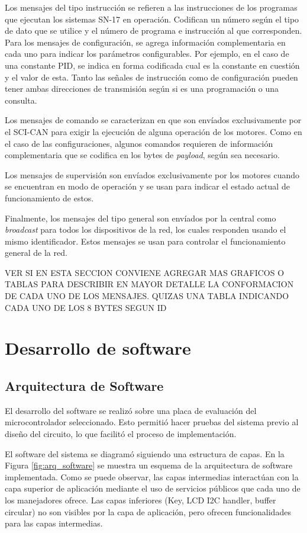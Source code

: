 Los mensajes del tipo instrucción se refieren a las instrucciones de los programas que ejecutan los sistemas SN-17 en operación. Codifican un número según el tipo de dato que se utilice y el número de programa e instrucción al que corresponden. Para los mensajes de configuración, se agrega información complementaria en cada uno para indicar los parámetros configurables. Por ejemplo, en el caso de una constante PID, se indica en forma codificada cual es la constante en cuestión y el valor de esta. Tanto las señales de instrucción como de configuración pueden tener ambas direcciones de transmisión según si es una programación o una consulta.

Los mensajes de comando se caracterizan en que son envíados exclusivamente por el SCI-CAN para exigir la ejecución de alguna operación de los motores. Como en el caso de las configuraciones, algunos comandos requieren de información complementaria que se codifica en los bytes de \textit{payload}, según sea necesario.

Los mensajes de supervisión son envíados exclusivamente por los motores cuando se encuentran en modo de operación y se usan para indicar el estado actual de funcionamiento de estos.

Finalmente, los mensajes del tipo general son envíados por la central como \textit{broadcast} para todos los dispositivos de la red, los cuales responden usando el mismo identificador. Estos mensajes se usan para controlar el funcionamiento general de la red.

VER SI EN ESTA SECCION CONVIENE AGREGAR MAS GRAFICOS O TABLAS PARA DESCRIBIR EN MAYOR DETALLE LA CONFORMACION DE CADA UNO DE LOS MENSAJES. QUIZAS UNA TABLA INDICANDO CADA UNO DE LOS 8 BYTES SEGUN ID

\section{Desarrollo de software}
\label{desarrollo_software}

\subsection{Arquitectura de Software}

El desarrollo del software se realizó sobre una placa de evaluación del microcontrolador seleccionado\citep{web_dev_board}. Esto permitió hacer pruebas del sistema previo al diseño del circuito, lo que facilitó el proceso de implementación.

El software del sistema se diagramó siguiendo una estructura de capas. En la Figura \ref{fig:arq_software} se muestra un esquema de la arquitectura de software implementada. Como se puede observar, las capas intermedias interactúan con la capa superior de aplicación mediante el uso de servicios públicos que cada uno de los manejadores ofrece. Las capas inferiores (Key, LCD I2C handler, buffer circular) no son visibles por la capa de aplicación, pero ofrecen funcionalidades para las capas intermedias. 

